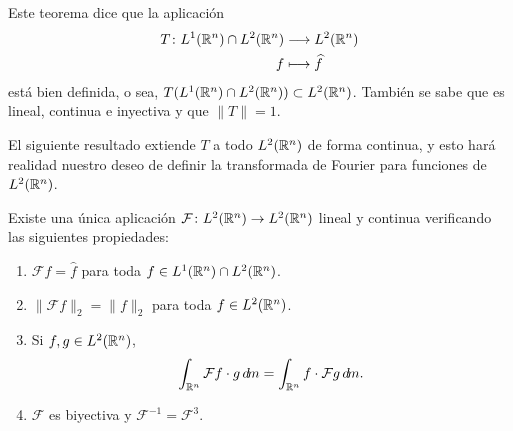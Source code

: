\documentclass[a4paper, 11pt, oneside]{report}
\begin{document}
Este teorema dice que la aplicación
\[\begin{aligned}[t]
  T \colon L^1(\mathbb R^n) \cap L^2(\mathbb R^n) &\longrightarrow L^2(\mathbb R^n) \\
  f &\longmapsto \widehat{f}
\end{aligned}\]
está bien definida, o sea, $T(L^1(\mathbb R^n) \cap L^2(\mathbb R^n)) \subset L^2(\mathbb R^n)$. También se sabe que es lineal, continua e inyectiva y que $\|T\|=1$. 

El siguiente resultado extiende $T$ a todo $L^2(\mathbb R^n)$ de forma continua, y esto hará realidad nuestro deseo de definir la transformada de Fourier para funciones de $L^2(\mathbb R^n)$.

\begin{theorem}\label{teo:3.3.4}
  Existe una única aplicación $\mathcal{F} \colon L^2(\mathbb R^n) \to L^2(\mathbb R^n)$ lineal y continua  verificando las siguientes propiedades:
  \begin{enumerate}
    \item $\mathcal{F}f = \widehat{f}$ para toda $f \in L^1(\mathbb R^n) \cap L^2(\mathbb R^n)$.
    \item $\|\mathcal{F}f\|_2 = \|f\|_2$ para toda $f \in L^2(\mathbb R^n)$.
    \item Si $f,g \in L^2(\mathbb R^n)$,
    \[\int_{\mathbb R^n} \mathcal{F}f \cdot g \, d\!m = \int_{\mathbb R^n} f \cdot \mathcal{F}g \, d\!m.\]
    \item $\mathcal{F}$ es biyectiva y $\mathcal{F}^{-1} = \mathcal{F}^3$.
  \end{enumerate}
\end{theorem}
\end{document}
